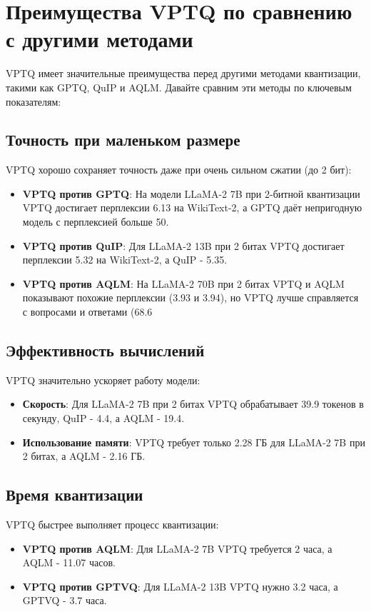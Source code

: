 \documentclass{article}
\begin{document}
\section{Преимущества VPTQ по сравнению с другими методами}
VPTQ имеет значительные преимущества перед другими методами квантизации, такими как GPTQ, QuIP и AQLM. Давайте сравним эти методы по ключевым показателям:
\subsection{Точность при маленьком размере}
VPTQ хорошо сохраняет точность даже при очень сильном сжатии (до 2 бит):
\begin{itemize}
\item \textbf{VPTQ против GPTQ}: На модели LLaMA-2 7B при 2-битной квантизации VPTQ достигает перплексии 6.13 на WikiText-2, а GPTQ даёт непригодную модель с перплексией больше 50.
\item \textbf{VPTQ против QuIP}: Для LLaMA-2 13B при 2 битах VPTQ достигает перплексии 5.32 на WikiText-2, а QuIP - 5.35.
\item \textbf{VPTQ против AQLM}: На LLaMA-2 70B при 2 битах VPTQ и AQLM показывают похожие перплексии (3.93 и 3.94), но VPTQ лучше справляется с вопросами и ответами (68.6%
\end{itemize}
\subsection{Эффективность вычислений}
VPTQ значительно ускоряет работу модели:
\begin{itemize}
\item \textbf{Скорость}: Для LLaMA-2 7B при 2 битах VPTQ обрабатывает 39.9 токенов в секунду, QuIP - 4.4, а AQLM - 19.4.
\item \textbf{Использование памяти}: VPTQ требует только 2.28 ГБ для LLaMA-2 7B при 2 битах, а AQLM - 2.16 ГБ.
\end{itemize}
\subsection{Время квантизации}
VPTQ быстрее выполняет процесс квантизации:
\begin{itemize}
\item \textbf{VPTQ против AQLM}: Для LLaMA-2 7B VPTQ требуется 2 часа, а AQLM - 11.07 часов.
\item \textbf{VPTQ против GPTVQ}: Для LLaMA-2 13B VPTQ нужно 3.2 часа, а GPTVQ - 3.7 часа.
\end{itemize}
\end{document}
